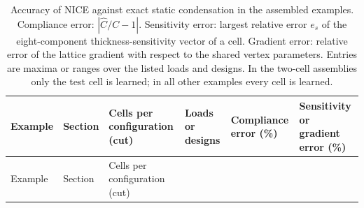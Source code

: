 \documentclass[preprint,12pt,authoryear]{elsarticle}
\begin{document}
{\footnotesize
\begin{longtable}[]{@{}
  >{\raggedright\arraybackslash}p{}
  >{\raggedright\arraybackslash}p{}
  >{\raggedright\arraybackslash}p{}
  >{\raggedright\arraybackslash}p{}
  >{\raggedleft\arraybackslash}p{}
  >{\raggedright\arraybackslash}p{}@{}}
\caption{Accuracy of NICE against exact static condensation in the assembled examples. Compliance error: \(|\widehat C/C-1|\). Sensitivity error: largest relative error \(e_s\) of the eight-component thickness-sensitivity vector of a cell. Gradient error: relative error of the lattice gradient with respect to the shared vertex parameters. Entries are maxima or ranges over the listed loads and designs. In the two-cell assemblies only the test cell is learned; in all other examples every cell is learned.}\tabularnewline
\toprule\noalign{}
\begin{minipage}[b]{\linewidth}\raggedright
Example
\end{minipage} & \begin{minipage}[b]{\linewidth}\raggedright
Section
\end{minipage} & \begin{minipage}[b]{\linewidth}\raggedright
Cells per configuration (cut)
\end{minipage} & \begin{minipage}[b]{\linewidth}\raggedright
Loads or designs
\end{minipage} & \begin{minipage}[b]{\linewidth}\raggedleft
Compliance error (\%)
\end{minipage} & \begin{minipage}[b]{\linewidth}\raggedright
Sensitivity or gradient error (\%)
\end{minipage} \\
\midrule\noalign{}
\endfirsthead
\toprule\noalign{}
\begin{minipage}[b]{\linewidth}\raggedright
Example
\end{minipage} & \begin{minipage}[b]{\linewidth}\raggedright
Section
\end{minipage} & \begin{minipage}[b]{\linewidth}\raggedright
Cells per configuration (cut)
\end{minipage} & \begin{minipage}[b]{\linewidth}\raggedright

\end{minipage}
\end{longtable}}
\end{document}
